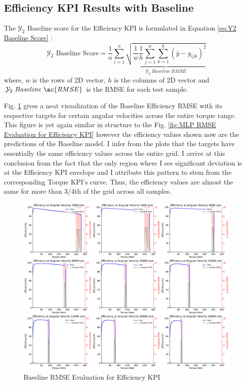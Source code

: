 \documentclass{report} %
\begin{document}
\subsection{Efficiency KPI Results with Baseline}\label{subsec:Efficiency KPI Results with Baseline}

The $\mathcal{Y}_2$ Baseline score for the Efficiency \ac{KPI} is formulated in Equation \ref{eq:Y2 Baseline Score} :
\begin{equation}
    \text{$\mathcal{Y}_2$ Baseline Score} = \frac{1}{n} \sum_{i=1}^{n} \underbrace{ \sqrt{\frac{1}{w} \frac{1}{h} \sum_{j=1}^{w} \sum_{k=1}^{h} (\bar{y} - y_{ijk})^2}}_{\mathcal{Y}_2\ Baseline\ RMSE}
    \label{eq:Y2 Baseline Score}
\end{equation}
where, \(w\) is the rows of 2\ac{D} vector, \(h\) is the columns of 2\ac{D} vector and \(\mathcal{Y}_2\ Baseline\ \ac{RMSE}\) is the \ac{RMSE} for each test sample.

Fig. \ref{fig:Baseline RMSE Evaluation for Efficiency KPI} gives a neat visualization of the Baseline Efficiency \ac{RMSE} with its respective targets for certain angular velocities  
across the entire torque range. This figure is yet again similar in structure to the Fig. \ref{fig:MLP RMSE Evaluation for Efficiency KPI} however the efficiency values 
shown now are the predictions of the Baseline model. I infer from the plots that the targets have essentially the same efficiency values across the entire grid.
I arrive at this conclusion from the fact that the only region where I see significant deviation is at the Efficiency \ac{KPI} envelope and I attribute this 
pattern to stem from the corresponding Torque \ac{KPI}'s curve. Thus, the efficiency values are almost the same for more than 3/4th of the grid across all samples.
\begin{figure}[H]
    \centering
    \includegraphics[width=1\textwidth]{./ReportImages/rmse_eta_Baseline.png} 
    \caption{Baseline \ac{RMSE} Evaluation for Efficiency \ac{KPI}} 
    \label{fig:Baseline RMSE Evaluation for Efficiency KPI}
\end{figure}
\end{document}
